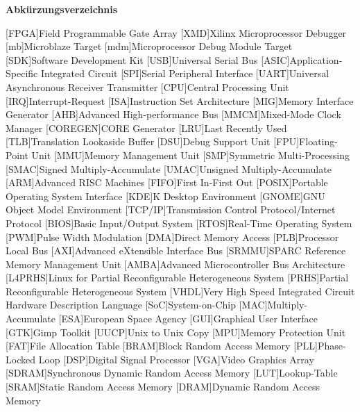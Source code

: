 
{\textbf{Abkürzungsverzeichnis}}

\begin{acronym}[Bash]
 [FPGA]{Field Programmable Gate Array}
 [XMD]{Xilinx Microprocessor Debugger}
 [mb]{Microblaze Target}
 [mdm]{Microprocessor Debug Module Target}
 [SDK]{Software Development Kit}
 [USB]{Universal Serial Bus}
 [ASIC]{Application-Specific Integrated Circuit}
 [SPI]{Serial Peripheral Interface}
 [UART]{Universal Asynchronous Receiver Transmitter}
 [CPU]{Central Processing Unit}
 [IRQ]{Interrupt-Request}
 [ISA]{Instruction Set Architecture}
 [MIG]{Memory Interface Generator}
 [AHB]{Advanced High-performance Bus}
 [MMCM]{Mixed-Mode Clock Manager}
 [COREGEN]{CORE Generator}
  [LRU]{Last Recently Used}
  [TLB]{Translation Lookaside Buffer}
  [DSU]{Debug Support Unit}
  [FPU]{Floating-Point Unit}
 [MMU]{Memory Management Unit}
  [SMP]{Symmetric Multi-Processing}
 [SMAC]{Signed Multiply-Accumulate}
  [UMAC]{Unsigned Multiply-Accumulate}
 [ARM]{Advanced RISC Machines}
 [FIFO]{First In-First Out}
 [POSIX]{Portable Operating System Interface}
 [KDE]{K Desktop Environment}
 [GNOME]{GNU Object Model Environment}
  [TCP/IP]{Transmission Control Protocol/Internet Protocol}
[BIOS]{Basic Input/Output System}
 [RTOS]{Real-Time Operating System}
 [PWM]{Pulse Width Modulation}
  [DMA]{Direct Memory Access}
 [PLB]{Processor Local Bus}
 [AXI]{Advanced eXtensible Interface Bus}
[SRMMU]{SPARC Reference Memory Management Unit}
 [AMBA]{Advanced Microcontroller Bus Architecture}
  [L4PRHS]{Linux for Partial Reconfigurable Heterogeneous System}
   [PRHS]{Partial Reconfigurable Heterogeneous System}
[VHDL]{Very High Speed Integrated Circuit Hardware Description Language}
[SoC]{System-on-Chip}
[MAC]{Multiply-Accumulate}
 [ESA]{European Space Agency}
 [GUI]{Graphical User Interface}
 [GTK]{Gimp Toolkit}
 [UUCP]{Unix to Unix Copy}
 [MPU]{Memory Protection Unit}
[FAT]{File Allocation Table}
  [BRAM]{Block Random Access Memory}
  [PLL]{Phase-Locked Loop}
  [DSP]{Digital Signal Processor}
  [VGA]{Video Graphics Array}
[SDRAM]{Synchronous Dynamic Random Access Memory}
 [LUT]{Lookup-Table}
 [SRAM]{Static Random Access Memory}
[DRAM]{Dynamic Random Access Memory}

\end{acronym}
